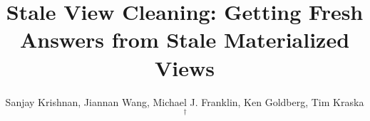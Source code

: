 \documentclass{vldb}
\begin{document}
\newcommand{\reminder}[1]{{{\textcolor{magenta}{\{\{\bf #1\}\}}}\xspace}}
\newcommand{\specialcell}[2][c]{%
  \begin{tabular}[#1]{@{}c@{}}#2\end{tabular}}

\def\ojoin{\setbox0=\hbox{$\bowtie$}%
  \rule[-.02ex]{.25em}{.4pt}\llap{\rule[\ht0]{.25em}{.4pt}}}
\def\leftouterjoin{\mathbin{\ojoin\mkern-5.8mu\bowtie}}
\def\rightouterjoin{\mathbin{\bowtie\mkern-5.8mu\ojoin}}
\def\fullouterjoin{\mathbin{\ojoin\mkern-5.8mu\bowtie\mkern-5.8mu\ojoin}}


\pagestyle{plain}

\title{Stale View Cleaning: Getting Fresh Answers from Stale Materialized Views}

\author{\large Sanjay Krishnan, Jiannan Wang, Michael J. Franklin, Ken Goldberg, Tim Kraska{$\,^\dag$} \\
\vspace{.2em} \\
\vspace{.1em}\\
}



\setcounter{page}{1}

\maketitle

\iffalse
\end{document}
